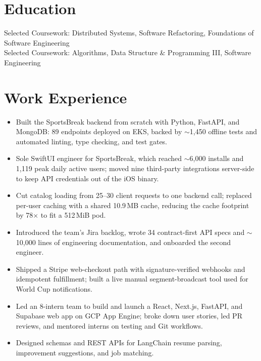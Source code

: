 \documentclass[11pt, letterpaper]{article}
\begin{document}

\section{Education}
Selected Coursework: Distributed Systems, Software Refactoring, Foundations of Software Engineering\\[1pt]
Selected Coursework: Algorithms, Data Structure \& Programming III, Software Engineering

\section{Work Experience}
\begin{itemize}
  \item Built the SportsBreak backend from scratch with Python, FastAPI, and MongoDB: 89 endpoints deployed on EKS, backed by $\sim$1{,}450 offline tests and automated linting, type checking, and test gates.
  \item Sole SwiftUI engineer for SportsBreak, which reached $\sim$6{,}000 installs and 1{,}119 peak daily active users; moved nine third-party integrations server-side to keep API credentials out of the iOS binary.
  \item Cut catalog loading from 25--30 client requests to one backend call; replaced per-user caching with a shared 10.9\,MB cache, reducing the cache footprint by 78$\times$ to fit a 512\,MiB pod.
  \item Introduced the team's Jira backlog, wrote 34 contract-first API specs and $\sim$10{,}000 lines of engineering documentation, and onboarded the second engineer.
  \item Shipped a Stripe web-checkout path with signature-verified webhooks and idempotent fulfillment; built a live manual segment-broadcast tool used for World Cup notifications.
\end{itemize}

\vspace{1pt}
\begin{itemize}
  \item Led an 8-intern team to build and launch a React, Next.js, FastAPI, and Supabase web app on GCP App Engine; broke down user stories, led PR reviews, and mentored interns on testing and Git workflows.
  \item Designed schemas and REST APIs for LangChain resume parsing, improvement suggestions, and job matching.
\end{itemize}
\end{document}
